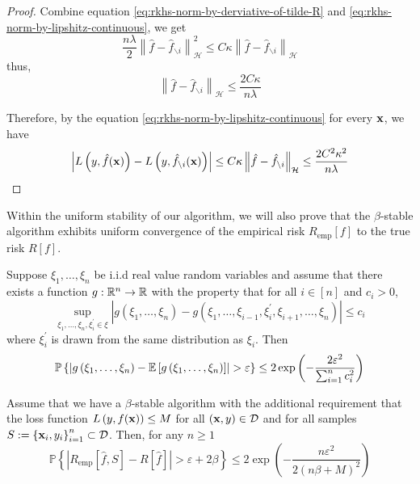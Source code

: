 \begin{proof}
	Combine equation \eqref{eq:rkhs-norm-by-derviative-of-tilde-R} and \eqref{eq:rkhs-norm-by-lipshitz-continuous}, we get
	\begin{equation}
		\frac{n\lambda}{2}\left\|\hat{f}-\hat{f}_{\backslash i}\right\|_{\mathcal{H}}^{2}\leq C\kappa\left\|\hat{f}-\hat{f}_{\backslash i}\right\|_{\mathcal{H}}
	\end{equation}
	thus,
	\begin{equation}
		\left\|\hat{f}-\hat{f}_{\backslash i}\right\|_{\mathcal{H}}\leq\frac{2C\kappa}{n\lambda}
	\end{equation}

	Therefore, by the equation \eqref{eq:rkhs-norm-by-lipshitz-continuous} for every ${\bf x}$, we have
	\begin{equation}
		\left|L\left(y,\hat{f}({\bf x})\right)-L\left(y,\hat{f}_{\backslash i}({\bf x})\right)\right|\leq C\kappa\left\|\hat{f}-\hat{f}_{\backslash i}\right\|_{\mathcal{H}}\leq\frac{2C^{2}\kappa^{2}}{n\lambda}
	\end{equation}
\end{proof}

Within the uniform stability of our algorithm, we will also prove that the $\beta$-stable algorithm exhibits uniform convergence of the empirical risk $R_{\text{emp}}[f]$ to the true risk $R[f]$.

\begin{theorem} \label{thm:McDiarmid-bound}
	Suppose $\xi_{1},\ldots,\xi_{n}$ be i.i.d real value random variables and assume that there exists a function $g:{\mathbb R}^{n}\rightarrow{\mathbb R}$ with the property that for all $i\in[n]$ and $c_{i}>0$,
	\begin{equation}
		\sup_{\xi_{1},\ldots,\xi_{n},\xi_{i}^{\prime}\in\xi}\left|g\left(\xi_{1},\ldots,\xi_{n}\right)-g\left(\xi_{1},\ldots,\xi_{i-1},\xi_{i}^{\prime},\xi_{i+1},\ldots,\xi_{n}\right)\right|\leq c_{i}
	\end{equation}
	where $\xi_{i}^{\prime}$ is drawn from the same distribution as $\xi_{i}$. Then
	\begin{equation}
		\mathbb{P}\left\{\left|g\left(\xi_{1},\ldots,\xi_{n}\right)-\bbE\left[g\left(\xi_{1},\ldots,\xi_{n}\right)\right]\right|>\varepsilon\right\}\leq 2\exp\left(-\frac{2\varepsilon^{2}}{\sum_{i=1}^{n}c_{i}^{2}}\right)
	\end{equation}
\end{theorem}

\begin{theorem} \label{thm:bousquet-and-elisseeff}
	Assume that we have a $\beta$-stable algorithm with the additional requirement that the loss function $L\left(y,f({\bf x})\right)\leq M$ for all $({\bf x},y)\in\mathcal{D}$ and for all samples $S:=\left\{{\bf x}_{i},y_{i}\right\}_{i=1}^{n}\subset\mathcal{D}$. Then, for any $n\geq 1$
	\begin{equation}
		\mathbb{P}\left\{\left|R_{\text{emp}}[\hat{f},S]-R[\hat{f}]\right|>\varepsilon+2\beta\right\}\leq 2\exp\left(-\frac{n\varepsilon^{2}}{2(n\beta+M)^{2}}\right)
	\end{equation}
\end{theorem}


